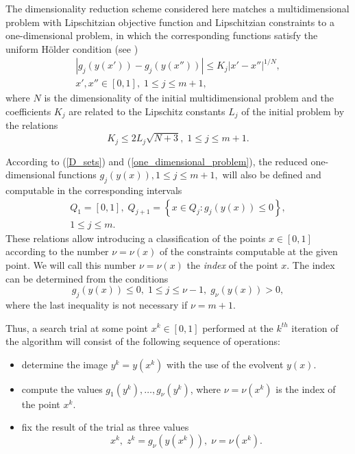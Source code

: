 \documentclass[twocolumn]{svjour3}          %
\begin{document}
	The dimensionality reduction scheme considered here matches a multidimensional problem with Lipschitzian objective function and Lipschitzian constraints to a one-dimensional problem, in which the corresponding functions satisfy the uniform H\"{o}lder condition (see \cite{Strongin2000,Sergeyev2013})
\begin{align*} 
	\left|g_j(y(x'))-g_j(y(x''))\right| \leq K_j \left|x'-x'' \right|^{1/N}, \\  
	x', x''\in [0,1], \; 1\leq j \leq m+1,
\end{align*}
where $N$ is the dimensionality of the initial multidimensional problem and the coefficients $K_j$ are related to the Lipschitz constants $L_j$ of the initial problem by the relations
\begin{equation}\label{K_leq_L}
	K_j \leq 2L_j \sqrt{N+3}, \; 1\leq j \leq m+1.
\end{equation}

	According to (\ref{D_sets}) and (\ref{one_dimensional_problem}), the reduced one-dimensional functions $g_j (y(x)), 1 \leq j \leq m+1,$ will also be defined and computable in the corresponding intervals 
\begin{align}\label{Q_intervals}
	Q_1=[0,1], \; Q_{j+1}=\left\{x \in Q_j : g_j(y(x)) \leq 0 \right\}, \nonumber \\
	1 \leq j \leq m.
\end{align}
These relations allow introducing a classification of the points $x \in [0,1]$ according to the number $\nu = \nu(x)$ of the constraints computable at the given point. We will call this number $\nu = \nu(x)$ the \textit{index} of the point $x$. The index can be determined from the conditions 
$$
	g_j(y(x)) \leq 0, \; 1 \leq j \leq \nu-1, \; g_{\nu}(y(x))>0,
$$
where the last inequality is not necessary if $\nu = m+1$. 

	Thus, a search trial at some point $x^k \in [0,1]$ performed at the $k^{th}$ iteration of the algorithm will consist of the following sequence of operations:
\begin{itemize} 
  \item determine the image $y^k=y(x^k )$ with the use of the evolvent $y(x)$. 
  \item compute the values $g_1 (y^k ), \ldots ,g_{\nu} (y^k )$, where $\nu = \nu(x^k)$ is the index of the point $x^k$.
	\item fix the result of the trial as three values 
\begin{equation}\label{trial_result}
	x^k, \; z^k = g_{\nu}\left( y(x^k) \right), \; \nu = \nu(x^k).
\end{equation}
\end{itemize}
	
\end{document}
